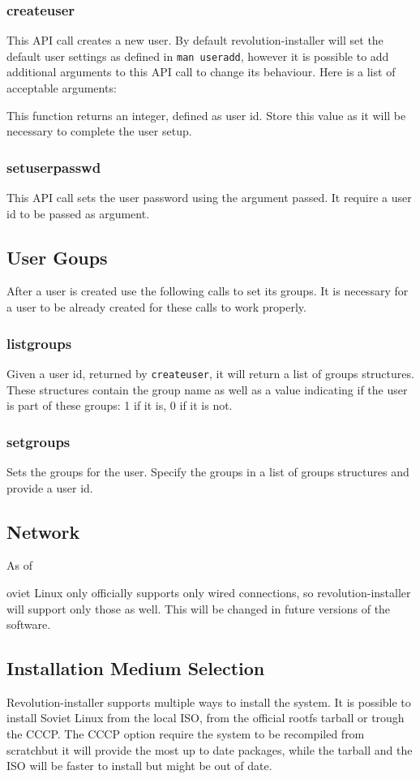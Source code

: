 \documentclass{scrartcl}
\begin{document}
\subsubsection{createuser}
This API call creates a new user. By default revolution-installer will set
the default user settings as defined in \texttt{man useradd}, however it
is possible to add additional arguments to this API call to change its behaviour.
Here is a list of acceptable arguments:

This function returns an integer, defined as user id. Store this value as it
will be necessary to complete the user setup.
\subsubsection{setuserpasswd}
This API call sets the user password using the argument passed. It require a
user id to be passed as argument.

\subsection{User Goups}
After a user is created use the following calls to set its groups. It is necessary
for a user to be already created for these calls to work properly.
\subsubsection{listgroups}
Given a user id, returned by \texttt{createuser}, it will return a list of
groups structures. These structures contain the group name as well as a value
indicating if the user is part of these groups: 1 if it is, 0 if it is not.
\subsubsection{setgroups}
Sets the groups for the user. Specify the groups in a list of groups structures
and provide a user id.

\subsection{Network}
As of \date Soviet Linux only officially supports only wired connections, so
revolution-installer will support only those as well. This will be changed in
future versions of the software.

\subsection{Installation Medium Selection}
Revolution-installer supports multiple ways to install the system. It is possible
to install Soviet Linux from the local ISO, from the official rootfs tarball or
trough the CCCP. The CCCP option require the system to  be recompiled from scratchbut it will provide the most up to date packages, while the tarball and the ISO
will be faster to install but might be out of date.
\end{document}
